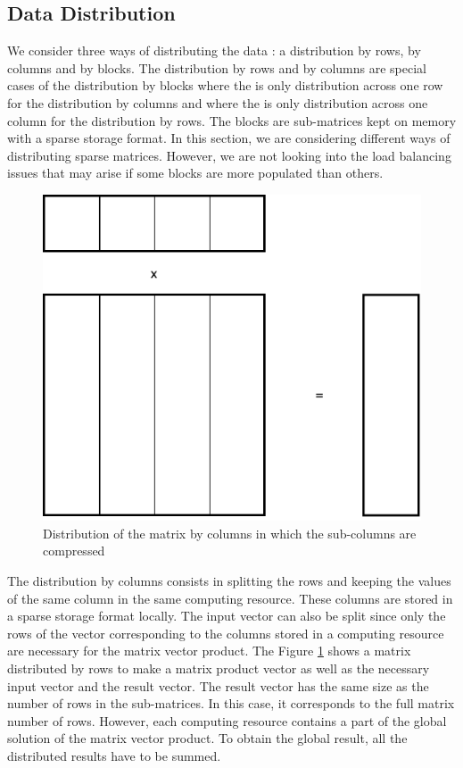 \subsection{Data Distribution \label{sec:sla:data_distribution}}

We consider three ways of distributing the data : a distribution by rows, by columns and by blocks.
The distribution by rows and by columns are special cases of the distribution by blocks where the is only distribution across one row for the distribution by columns and where the is only distribution across one column for the distribution by rows.
The blocks are sub-matrices kept on memory with a sparse storage format.
In this section, we are considering different ways of distributing sparse matrices.
However, we are not looking into the load balancing issues that may arise if some blocks are more populated than others.


\begin{figure}[h]
	\centering
	\includegraphics[width=.5\textwidth]{pmv_c}
	\caption{Distribution of the matrix by columns in which the sub-columns are compressed \label{fig:sparse:pmv_c}}
\end{figure}

The distribution by columns consists in splitting the rows and keeping the values of the same column in the same computing resource.
These columns are stored in a sparse storage format locally.
The input vector can also be split since only the rows of the vector corresponding to the columns stored in a computing resource are necessary for the matrix vector product.
The Figure \ref{fig:sparse:pmv_c} shows a matrix distributed by rows to make a matrix product vector as well as the necessary input vector and the result vector.
The result vector has the same size as the number of rows in the sub-matrices.
In this case, it corresponds to the full matrix number of rows.
However, each computing resource contains a part of the global solution of the matrix vector product.
To obtain the global result, all the distributed results have to be summed.



